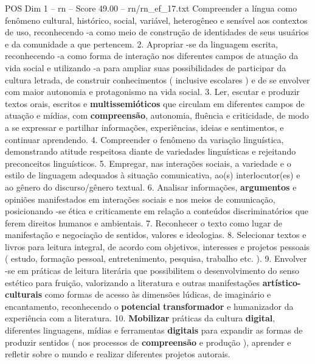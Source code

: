\begin{textsample}{POS Dim 1 – rn – Score 49.00 – rn/rn\_ef\_17.txt}
Compreender a língua como fenômeno cultural, histórico, social, variável, heterogêneo e sensível aos contextos de uso, reconhecendo -a como meio de construção de identidades de seus usuários e da comunidade a que pertencem. 2.
Apropriar -se da linguagem escrita, reconhecendo -a como forma de interação nos diferentes campos de atuação da vida social e utilizando -a para ampliar suas possibilidades de participar da cultura letrada, de construir conhecimentos ( inclusive escolares ) e de se envolver com maior autonomia e protagonismo na vida social. 3.
Ler, escutar e produzir textos orais, escritos e \textbf{multissemióticos} que circulam em diferentes campos de atuação e mídias, com \textbf{compreensão}, autonomia, fluência e criticidade, de modo a se expressar e partilhar informações, experiências, ideias e sentimentos, e continuar aprendendo. 4.
Compreender o fenômeno da variação linguística, demonstrando atitude respeitosa diante de variedades linguísticas e rejeitando preconceitos linguísticos. 5.
Empregar, nas interações sociais, a variedade e o estilo de linguagem adequados à situação comunicativa, ao(s) interlocutor(es) e ao gênero do discurso/gênero textual. 6.
Analisar informações, \textbf{argumentos} e opiniões manifestados em interações sociais e nos meios de comunicação, posicionando -se ética e criticamente em relação a conteúdos discriminatórios que ferem direitos humanos e ambientais. 7.
Reconhecer o texto como lugar de manifestação e negociação de sentidos, valores e ideologias. 8.
Selecionar textos e livros para leitura integral, de acordo com objetivos, interesses e projetos pessoais ( estudo, formação pessoal, entretenimento, pesquisa, trabalho etc. ). 9.
Envolver -se em práticas de leitura literária que possibilitem o desenvolvimento do senso estético para fruição, valorizando a literatura e outras manifestações \textbf{artístico-culturais} como formas de acesso às dimensões lúdicas, de imaginário e encantamento, reconhecendo o \textbf{potencial} \textbf{transformador} e humanizador da experiência com a literatura. 10. \textbf{Mobilizar} práticas da cultura \textbf{digital}, diferentes linguagens, mídias e ferramentas \textbf{digitais} para expandir as formas de produzir sentidos ( nos processos de \textbf{compreensão} e produção ), aprender e refletir sobre o mundo e realizar diferentes projetos autorais.

\end{textsample}
